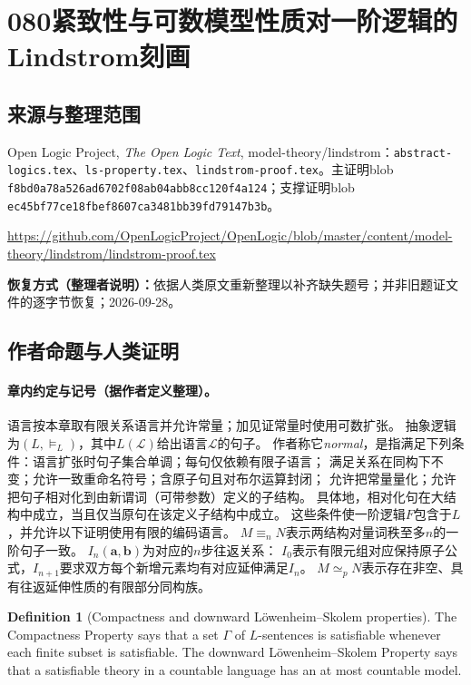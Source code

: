 \documentclass[UTF8,11pt]{ctexart}
\theoremstyle{definition}
\newtheorem*{definition}{Definition}
\begin{document}
\section*{080\quad 紧致性与可数模型性质对一阶逻辑的Lindstrom刻画}
\subsection*{来源与整理范围}
Open Logic Project, \emph{The Open Logic Text}, model-theory/lindstrom：\texttt{abstract-logics.tex}、\texttt{ls-property.tex}、\texttt{lindstrom-proof.tex}。主证明blob \nolinkurl{f8bd0a78a526ad6702f08ab04abb8cc120f4a124}；支撑证明blob \nolinkurl{ec45bf77ce18fbef8607ca3481bb39fd79147b3b}。
\par\url{https://github.com/OpenLogicProject/OpenLogic/blob/master/content/model-theory/lindstrom/lindstrom-proof.tex}
\par\textbf{恢复方式（整理者说明）：}依据人类原文重新整理以补齐缺失题号；并非旧题证文件的逐字节恢复；2026-09-28。
\subsection*{作者命题与人类证明}

\paragraph{章内约定与记号（据作者定义整理）。}
语言按本章取有限关系语言并允许常量；加见证常量时使用可数扩张。
抽象逻辑为$(L,\models_L)$，其中$L(\mathcal L)$给出语言$\mathcal L$的句子。
作者称它\emph{normal}，是指满足下列条件：语言扩张时句子集合单调；每句仅依赖有限子语言；
满足关系在同构下不变；允许一致重命名符号；含原子句且对布尔运算封闭；
允许把常量量化；允许把句子相对化到由新谓词（可带参数）定义的子结构。
具体地，相对化句在大结构中成立，当且仅当原句在该定义子结构中成立。
这些条件使一阶逻辑$F$包含于$L$，并允许以下证明使用有限的编码语言。
$M\equiv_nN$表示两结构对量词秩至多$n$的一阶句子一致。
$I_n(\mathbf a,\mathbf b)$为对应的$n$步往返关系：
$I_0$表示有限元组对应保持原子公式，$I_{n+1}$要求双方每个新增元素均有对应延伸满足$I_n$。
$M\simeq_pN$表示存在非空、具有往返延伸性质的有限部分同构族。

\begin{definition}[Compactness and downward L\"owenheim--Skolem properties]
The Compactness Property says that a set $\Gamma$ of $L$-sentences is
satisfiable whenever each finite subset is satisfiable.
The downward L\"owenheim--Skolem Property says that a satisfiable theory
in a countable language has an at most countable model.
\end{definition}
\end{document}

